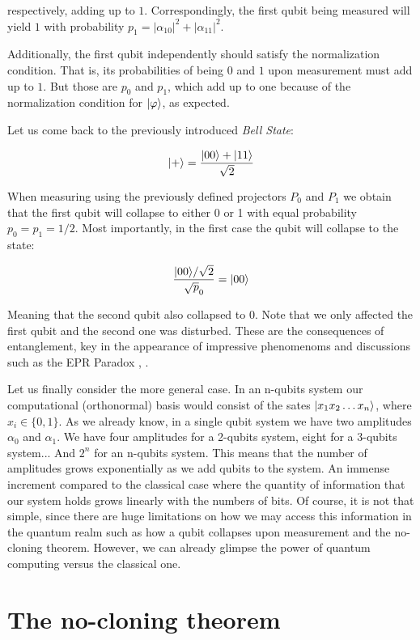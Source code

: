 respectively, adding up to $1$. Correspondingly, the first qubit being measured will yield $1$ with probability $p_1 = |\alpha_{10}|^2 + |\alpha_{11}|^2$.

Additionally, the first qubit independently should satisfy the normalization condition. That is, its probabilities of being $0$ and $1$ upon measurement must add up to $1$. But those are $p_0$ and $p_1$, which add up to one because of the normalization condition for $|\varphi\rangle$, as expected.

Let us come back to the previously introduced \emph{Bell State}:

$$ |+\rangle = \frac{ |00\rangle + |11\rangle }{ \sqrt 2 } $$

When measuring using the previously defined projectors $P_0$ and $P_1$ we obtain that the first qubit will collapse to either 0 or 1 with equal probability $p_0 = p_1 = 1/2$. Most importantly, in the first case the qubit will collapse to the state:

$$ \frac{ |00\rangle / \sqrt 2 }{ \sqrt p_0 } = |00\rangle $$

Meaning that the second qubit also collapsed to 0. Note that we only affected the first qubit and the second one was disturbed. These are the consequences of entanglement, key in the appearance of impressive phenomenoms and discussions such as the EPR Paradox \cite{Einstein1935}, \cite{Bellt1964}.

Let us finally consider the more general case. In an n-qubits system our computational (orthonormal) basis would consist of the sates $|x_1 x_2 \dotsc x_n\rangle$, where $x_i \in \{0,1\}$. As we already know, in a single qubit system we have two amplitudes $\alpha_0$ and $\alpha_1$. We have four amplitudes for a 2-qubits system, eight for a 3-qubits system... And $2^n$ for an n-qubits system. This means that the number of amplitudes grows exponentially as we add qubits to the system. An immense increment compared to the classical case where the quantity of information that our system holds grows linearly with the numbers of bits. Of course, it is not that simple, since there are huge limitations on how we may access this information in the quantum realm such as how a qubit collapses upon measurement and the no-cloning theorem. However, we can already glimpse the power of quantum computing versus the classical one.


\section{The no-cloning theorem}


